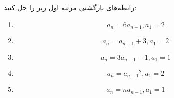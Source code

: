     \p 
رابطه‌های بازگشتی مرتبه اول زیر را حل کنید:
\begin{enumerate}
\item
$$a_n  = 6a_{n-1}, a_1 = 2$$
\item
$$a_n = a_{n-1} + 3, a_1 = 2$$
\item
$$a_n = 3a_{n-1} - 1, a_1 = 1$$
\item
$$a_n = {a_{n-1}}^2, a_1 = 2$$
\item
$$a_n = na_{n-1}, a_1 = 1$$
\end{enumerate}